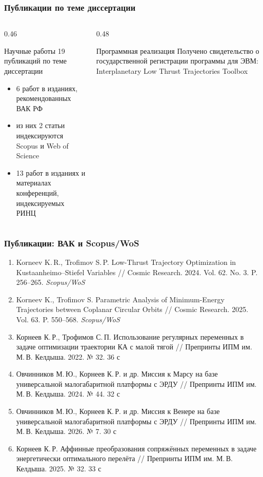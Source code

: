 \begin{frame}
    \frametitle{Публикации по теме диссертации}
    \begin{columns}[T,onlytextwidth]
        \begin{column}{0.46\textwidth}
            \begin{block}{Научные работы}
                \Large 19
                \normalsize публикаций по теме диссертации
            \end{block}
            \begin{itemize}
                \item 6 работ в изданиях, рекомендованных ВАК РФ
                \item из них 2 статьи индексируются Scopus и Web of Science
                \item 13 работ в изданиях и материалах конференций, индексируемых РИНЦ
            \end{itemize}
        \end{column}
        \begin{column}{0.48\textwidth}
            \begin{block}{Программная реализация}
                Получено свидетельство о государственной регистрации программы для ЭВМ:
                Interplanetary Low Thrust Trajectories Toolbox
            \end{block}
        \end{column}
    \end{columns}
\end{frame}
\begin{frame}
    \frametitle{Публикации: ВАК и Scopus/WoS}
    \scriptsize
    \begin{enumerate}
        \item Korneev K.\,R., Trofimov S.\,P. Low-Thrust Trajectory Optimization in Kustaanheimo--Stiefel Variables // Cosmic Research. 2024. Vol. 62. No. 3. P. 256--265. \textit{Scopus/WoS}
        \item Korneev K., Trofimov S. Parametric Analysis of Minimum-Energy Trajectories between Coplanar Circular Orbits // Cosmic Research. 2025. Vol. 63. P. 550--568. \textit{Scopus/WoS}
        \item Корнеев К.\,Р., Трофимов С.\,П. Использование регулярных переменных в задаче оптимизации траектории КА с малой тягой // Препринты ИПМ им. М.\,В. Келдыша. 2022. № 32. 36 с
        \item Овчинников М.\,Ю., Корнеев К.\,Р. и др. Миссия к Марсу на базе универсальной малогабаритной платформы с ЭРДУ // Препринты ИПМ им. М.\,В. Келдыша. 2024. № 44. 32 с
        \item Овчинников М.\,Ю., Корнеев К.\,Р. и др. Миссия к Венере на базе универсальной малогабаритной платформы с ЭРДУ // Препринты ИПМ им. М.\,В. Келдыша. 2026. № 7. 30 с
        \item Корнеев К.\,Р. Аффинные преобразования сопряжённых переменных в задаче энергетически оптимального перелёта // Препринты ИПМ им. М.\,В. Келдыша. 2025. № 32. 33 с
    \end{enumerate}
\end{frame}

